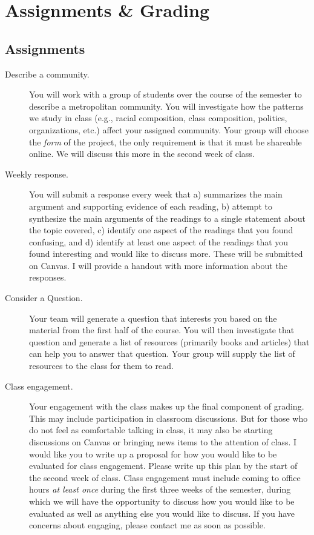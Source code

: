 \documentclass[11pt]{syllabus}
\begin{document}


\section{Assignments \& Grading}
\subsection{Assignments}
\begin{description}
\item[Describe a community.] You will work with a group of students over the course of the semester to describe a metropolitan community. You will investigate how the patterns we study in class (e.g., racial composition, class composition, politics, organizations, etc.) affect your assigned community. Your group will choose the \emph{form} of the project, the only requirement is that it must be shareable online. We will discuss this more in the second week of class. 

\item[Weekly response.] You will submit a response every week that a) summarizes the main argument and supporting evidence of each reading, b) attempt to synthesize the main arguments of the readings to a single statement about the topic covered, c) identify one aspect of the readings that you found confusing, and d) identify at least one aspect of the readings that you found interesting and would like to discuss more. These will be submitted on Canvas. I will provide a handout with more information about the responses. 

\item[Consider a Question.] Your team will generate a question that interests you based on the material from the first half of the course. You will then investigate that question and generate a list of resources (primarily books and articles) that can help you to answer that question. Your group will supply the list of resources to the class for them to read. 

\item[Class engagement.] Your engagement with the class makes up the final component of grading. This may include participation in classroom discussions. But for those who do not feel as comfortable talking in class, it may also be starting discussions on Canvas or bringing news items to the attention of class. I would like you to write up a proposal for how you would like to be evaluated for class engagement. Please write up this plan by the start of the second week of class. Class engagement must include coming to office hours \emph{at least once} during the first three weeks of the semester, during which we will have the opportunity to discuss how you would like to be evaluated as well as anything else you would like to discuss. If you have concerns about engaging, please contact me as soon as possible. 

\end{description}
\end{document}
